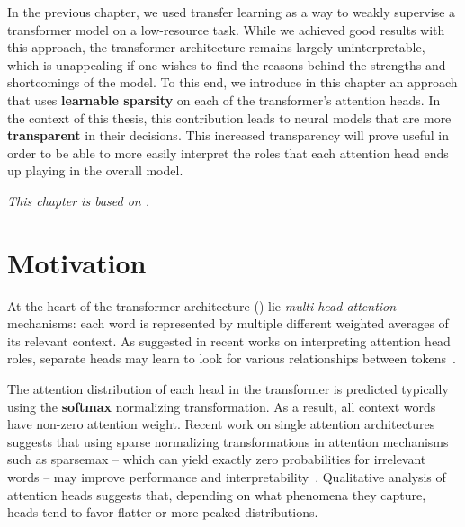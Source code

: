 \label{chap:adaptsparse}

\cleardoublepage
\doublespacing

\noindent In the previous chapter, we used transfer learning as a way
to weakly supervise a transformer model on a low-resource task.
While we achieved good results with this approach, the
transformer architecture remains largely uninterpretable,
which is unappealing if one wishes to find the
reasons behind the strengths and shortcomings of the model.
To this end, we introduce in this chapter an approach that
uses \textbf{learnable sparsity} on each of the transformer's
attention heads. In the context of this thesis, this contribution
leads to neural models that are more \textbf{transparent} in their
decisions. This increased transparency will prove useful in order to
be able to more easily interpret the roles that each attention head
ends up playing in the overall model.

\textit{This chapter is based on \citet*{correia2019adaptively}.}

\section{Motivation}

\noindent At the heart of the transformer architecture
() lie \emph{multi-head attention}
mechanisms: each word is represented by multiple different weighted
averages of its relevant context. As suggested in recent works on
interpreting attention head roles, separate heads may learn
to look for various relationships between
tokens~\citep{tang2018why,raganato2018analysis,
    marecek-rosa-2018-extracting,bert-rediscovers,specialized}.

The attention distribution of each head in the transformer is
predicted typically using the \textbf{softmax} normalizing transformation.
As a result, all context words have non-zero attention weight. Recent
work on single attention architectures suggests that using sparse
normalizing transformations in attention mechanisms such as sparsemax --
which can yield exactly zero probabilities for irrelevant words --
may improve performance and
interpretability~\citep{malaviya2018sparse,deng2018latent,entmax}.
Qualitative analysis of attention heads
\citep[Figure~5]{vaswani2017attention} suggests that, depending on
what phenomena they capture, heads tend to favor flatter or more
peaked distributions.

